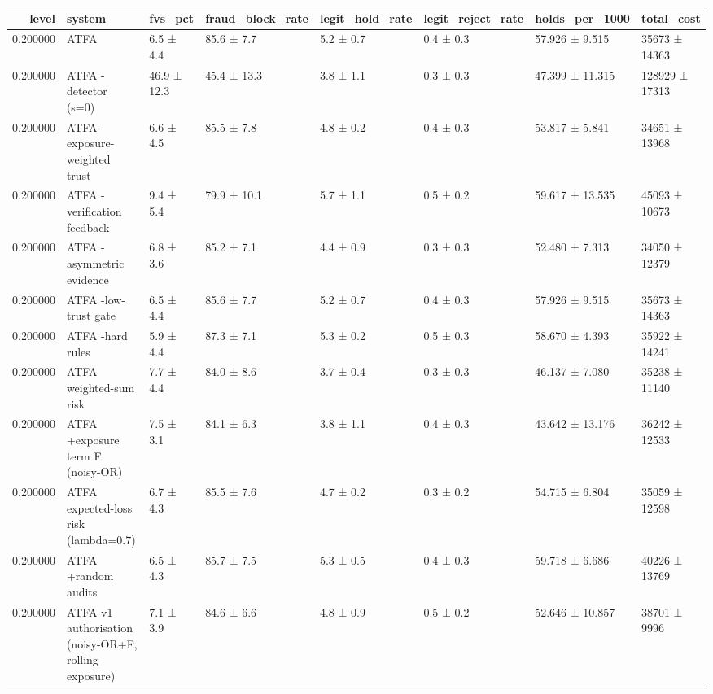\begin{tabular}{rlllllll}
\toprule
level & system & fvs\_pct & fraud\_block\_rate & legit\_hold\_rate & legit\_reject\_rate & holds\_per\_1000 & total\_cost \\
\midrule
0.200000 & ATFA & 6.5 ± 4.4 & 85.6 ± 7.7 & 5.2 ± 0.7 & 0.4 ± 0.3 & 57.926 ± 9.515 & 35673 ± 14363 \\
0.200000 & ATFA -detector (s=0) & 46.9 ± 12.3 & 45.4 ± 13.3 & 3.8 ± 1.1 & 0.3 ± 0.3 & 47.399 ± 11.315 & 128929 ± 17313 \\
0.200000 & ATFA -exposure-weighted trust & 6.6 ± 4.5 & 85.5 ± 7.8 & 4.8 ± 0.2 & 0.4 ± 0.3 & 53.817 ± 5.841 & 34651 ± 13968 \\
0.200000 & ATFA -verification feedback & 9.4 ± 5.4 & 79.9 ± 10.1 & 5.7 ± 1.1 & 0.5 ± 0.2 & 59.617 ± 13.535 & 45093 ± 10673 \\
0.200000 & ATFA -asymmetric evidence & 6.8 ± 3.6 & 85.2 ± 7.1 & 4.4 ± 0.9 & 0.3 ± 0.3 & 52.480 ± 7.313 & 34050 ± 12379 \\
0.200000 & ATFA -low-trust gate & 6.5 ± 4.4 & 85.6 ± 7.7 & 5.2 ± 0.7 & 0.4 ± 0.3 & 57.926 ± 9.515 & 35673 ± 14363 \\
0.200000 & ATFA -hard rules & 5.9 ± 4.4 & 87.3 ± 7.1 & 5.3 ± 0.2 & 0.5 ± 0.3 & 58.670 ± 4.393 & 35922 ± 14241 \\
0.200000 & ATFA weighted-sum risk & 7.7 ± 4.4 & 84.0 ± 8.6 & 3.7 ± 0.4 & 0.3 ± 0.3 & 46.137 ± 7.080 & 35238 ± 11140 \\
0.200000 & ATFA +exposure term F (noisy-OR) & 7.5 ± 3.1 & 84.1 ± 6.3 & 3.8 ± 1.1 & 0.4 ± 0.3 & 43.642 ± 13.176 & 36242 ± 12533 \\
0.200000 & ATFA expected-loss risk (lambda=0.7) & 6.7 ± 4.3 & 85.5 ± 7.6 & 4.7 ± 0.2 & 0.3 ± 0.2 & 54.715 ± 6.804 & 35059 ± 12598 \\
0.200000 & ATFA +random audits & 6.5 ± 4.3 & 85.7 ± 7.5 & 5.3 ± 0.5 & 0.4 ± 0.3 & 59.718 ± 6.686 & 40226 ± 13769 \\
0.200000 & ATFA v1 authorisation (noisy-OR+F, rolling exposure) & 7.1 ± 3.9 & 84.6 ± 6.6 & 4.8 ± 0.9 & 0.5 ± 0.2 & 52.646 ± 10.857 & 38701 ± 9996 \\
\bottomrule
\end{tabular}
